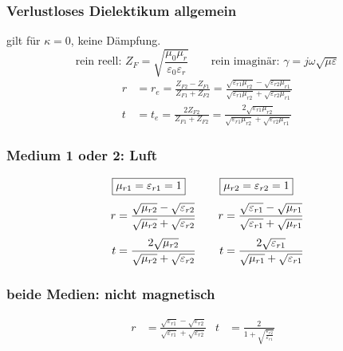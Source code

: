 \subsubsection[Senkrechter Einfall ideales/verlustl. Dielekt.]{Verlustloses Dielektikum allgemein}
gilt für $ \kappa =0 $, keine Dämpfung.
\[ \text{rein reell: }Z_F=  \sqrt{\frac{\mu_0\mu_r}{\varepsilon_0\varepsilon_r}}  \qquad
	\text{rein imaginär: }\gamma  = j \omega\sqrt{\mu\varepsilon} \]
\begin{align*}
	r & = r_e =\frac{Z_{F2} - Z_{F1}}{Z_{F1} + Z_{F2}} = \frac{\sqrt{\varepsilon_{r1}\mu_{r2}} - \sqrt{\varepsilon_{r2}\mu_{r1}} }{\sqrt{\varepsilon_{r1}\mu_{r2}}+{\sqrt{\varepsilon_{r2}\mu_{r1}}}} \\
	t & = t_e = \frac{2 Z_{F2}}{Z_{F1} + Z_{F2}} = \frac{2\sqrt{\varepsilon_{r1}\mu_{r2}}}{\sqrt{\varepsilon_{r1}\mu_{r2}}+\sqrt{\varepsilon_{r2}\mu_{r1}}}
\end{align*}

\subsubsection{Medium 1 oder 2: Luft}
\begin{equation*}
	\setlength{\jot}{6pt}
	\begin{aligned}[t]
		\Aboxed{ & \mu_{r1} = \varepsilon_{r1} = 1}                                                            \\
		r        & = \frac{\sqrt{\mu_{r2}}-\sqrt{\varepsilon_{r2}}}{{\sqrt{\mu_{r2}}+\sqrt{\varepsilon_{r2}}}} \\
		t        & = \frac{2\sqrt{\mu_{r2}}}{\sqrt{\mu_{r2}}+\sqrt{\varepsilon_{r2}}}
	\end{aligned}
	\qquad
	\begin{aligned}[t]
		\Aboxed{ & \mu_{r2} = \varepsilon_{r2} = 1}                                                            \\
		r        & = \frac{\sqrt{\varepsilon_{r1}}-\sqrt{\mu_{r1}}}{{\sqrt{\varepsilon_{r1}}+\sqrt{\mu_{r1}}}} \\
		t        & = \frac{2\sqrt{\varepsilon_{r1}}}{\sqrt{\mu_{r1}}+\sqrt{\varepsilon_{r1}}}
	\end{aligned}
\end{equation*}

\subsubsection{beide Medien: nicht magnetisch}
\begin{align*}
	r & = \frac{\sqrt{\varepsilon_{r1}}-\sqrt{\varepsilon_{r2}}}{{\sqrt{\varepsilon_{r1}}+\sqrt{\varepsilon_{r2}}}} &
	t & = \frac{2}{1+\sqrt{\frac{\varepsilon_{r2}}{\varepsilon_{r1}}}}                                              &
\end{align*}

